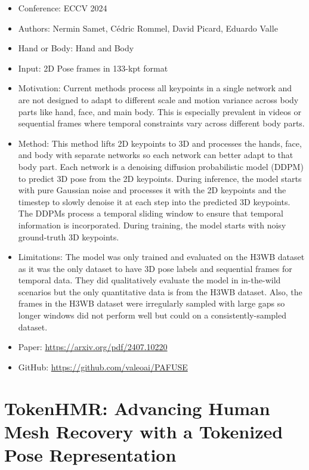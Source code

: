 \documentclass{article}
\begin{document}
\begin{itemize}
    \item Conference: ECCV 2024
    \item Authors: Nermin Samet, Cédric Rommel, David Picard, Eduardo Valle
    \item Hand or Body: Hand and Body
    \item Input: 2D Pose frames in 133-kpt format
    \item Motivation: Current methods process all keypoints in a single network and are not designed to adapt to different scale and motion variance across body parts like hand, face, and main body. This is especially prevalent in videos or sequential frames where temporal constraints vary across different body parts.
    \item Method: This method lifts 2D keypoints to 3D and processes the hands, face, and body with separate networks so each network can better adapt to that body part. Each network is a denoising diffusion probabilistic model (DDPM) to predict 3D pose from the 2D keypoints. During inference, the model starts with pure Gaussian noise and processes it with the 2D keypoints and the timestep to slowly denoise it at each step into the predicted 3D keypoints. The DDPMs process a temporal sliding window to ensure that temporal information is incorporated. During training, the model starts with noisy ground-truth 3D keypoints.
    \item Limitations: The model was only trained and evaluated on the H3WB dataset as it was the only dataset to have 3D pose labels and sequential frames for temporal data. They did qualitatively evaluate the model in in-the-wild scenarios but the only quantitative data is from the H3WB dataset. Also, the frames in the H3WB dataset were irregularly sampled with large gaps so longer windows did not perform well but could on a consistently-sampled dataset.
    \item Paper: \url{https://arxiv.org/pdf/2407.10220}
    \item GitHub: \url{https://github.com/valeoai/PAFUSE}
\end{itemize}

\section*{TokenHMR\@: Advancing Human Mesh Recovery with a Tokenized Pose Representation}
\end{document}
